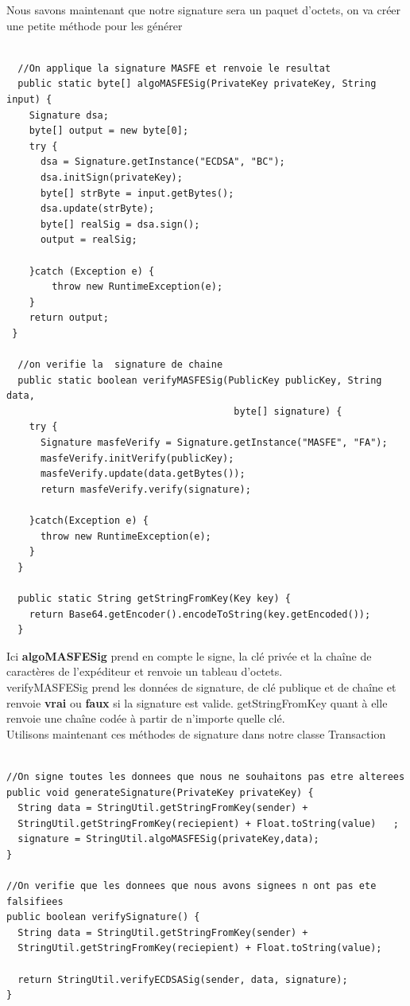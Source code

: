 \documentclass[12pt]{report}
\begin{document}
\hspace{1cm} Nous savons maintenant que notre signature sera un paquet d’octets, on va créer une petite  méthode pour les générer\\

\begin{lstlisting}

  //On applique la signature MASFE et renvoie le resultat
  public static byte[] algoMASFESig(PrivateKey privateKey, String input) {
    Signature dsa;
    byte[] output = new byte[0];
    try {
      dsa = Signature.getInstance("ECDSA", "BC");
      dsa.initSign(privateKey);
      byte[] strByte = input.getBytes();
      dsa.update(strByte);
      byte[] realSig = dsa.sign();
      output = realSig;
		
    }catch (Exception e) {
        throw new RuntimeException(e);
    }
    return output;
 }
	
  //on verifie la  signature de chaine
  public static boolean verifyMASFESig(PublicKey publicKey, String data, 
                                        byte[] signature) {
    try {
      Signature masfeVerify = Signature.getInstance("MASFE", "FA");
      masfeVerify.initVerify(publicKey);
      masfeVerify.update(data.getBytes());
      return masfeVerify.verify(signature);
    
    }catch(Exception e) {
      throw new RuntimeException(e);
    }
  }

  public static String getStringFromKey(Key key) {
    return Base64.getEncoder().encodeToString(key.getEncoded());
  }
\end{lstlisting}

\hspace{1cm}Ici \textbf{algoMASFESig} prend en compte le signe, la clé privée et la chaîne de caractères de l'expéditeur  et renvoie un tableau d'octets. \\ 
verifyMASFESig prend les données de signature, de clé publique et de chaîne et renvoie \textbf{vrai} ou \textbf{faux} si la signature est valide. getStringFromKey quant à elle renvoie une chaîne codée à partir de n'importe quelle clé.\\
Utilisons maintenant ces méthodes de signature dans notre classe Transaction 

\begin{lstlisting}

//On signe toutes les donnees que nous ne souhaitons pas etre alterees
public void generateSignature(PrivateKey privateKey) {
  String data = StringUtil.getStringFromKey(sender) +
  StringUtil.getStringFromKey(reciepient) + Float.toString(value)	;
  signature = StringUtil.algoMASFESig(privateKey,data);		
}

//On verifie que les donnees que nous avons signees n ont pas ete falsifiees
public boolean verifySignature() {
  String data = StringUtil.getStringFromKey(sender) +
  StringUtil.getStringFromKey(reciepient) + Float.toString(value);
  
  return StringUtil.verifyECDSASig(sender, data, signature);
}

\end{lstlisting}
\end{document}
